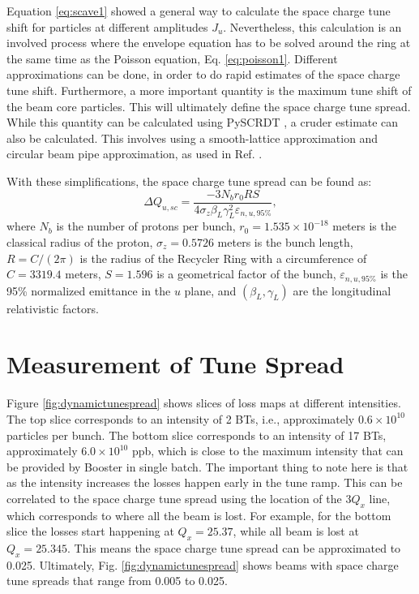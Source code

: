 Equation \ref{eq:scave1} showed a general way to calculate the space charge tune shift for particles at different amplitudes $J_u$. Nevertheless, this calculation is an involved process where the envelope equation has to be solved around the ring at the same time as the Poisson equation, Eq. \ref{eq:poisson1}. Different approximations can be done, in order to do rapid estimates of the space charge tune shift. Furthermore, a more important quantity is the maximum tune shift of the beam core particles. This will ultimately define the space charge tune spread. While this quantity can be calculated using PySCRDT \cite{scrdt_report}, a cruder estimate can also be calculated. This involves using a smooth-lattice approximation and circular beam pipe approximation, as used in Ref. \cite{zhang}. 

With these simplifications, the space charge tune spread can be found as:
\begin{equation}
    \label{eq:tunesc}
    \Delta Q_{u,sc}=\frac{-3 N_b r_0 R S}{4 \sigma_z \beta_L \gamma_L ^2 \varepsilon_{n,u,95\%}},    
\end{equation}
where $N_b$ is the number of protons per bunch, $r_0=1.535\times 10^{-18}$ meters is the classical radius of the proton, $\sigma_z = 0.5726$ meters is the bunch length, $R = C/(2 \pi)$ is the radius of the Recycler Ring with a circumference of $C=3319.4$ meters, $S=1.596$ is a geometrical factor of the bunch, $\varepsilon_{n,u,95\%}$ is the 95\% normalized emittance in the $u$ plane, and $(\beta_L,\gamma_L)$ are the longitudinal relativistic factors.   

\section{Measurement of Tune Spread}

Figure \ref{fig:dynamictunespread} shows slices of loss maps at different intensities. The top slice corresponds to an intensity of 2 BTs, i.e., approximately $0.6\times10^{10}$ particles per bunch. The bottom slice corresponds to an intensity of 17 BTs, approximately $6.0\times10^{10}$ ppb, which is close to the maximum intensity that can be provided by Booster in single batch. The important thing to note here is that as the intensity increases the losses happen early in the tune ramp. This can be correlated to the space charge tune spread using the location of the $3Q_x$ line, which corresponds to where all the beam is lost. For example, for the bottom slice the losses start happening at $Q_x=25.37$, while all beam is lost at $Q_x=25.345$. This means the space charge tune spread can be approximated to 0.025. Ultimately, Fig. \ref{fig:dynamictunespread} shows beams with space charge tune spreads that range from 0.005 to 0.025.


